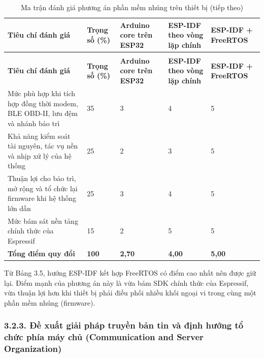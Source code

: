 \documentclass[a4paper]{extarticle}
\newcommand{\thesissettableid}[2]{%
  \renewcommand{\thetable}{#1}%
  \renewcommand{\theHtable}{#2}%
}
\begin{document}
{\thesissettableid{3.5}{condensed-r2-bang-3-5-ma-tran-danh-gia-phuong-an-phan-mem-nhung-tren-thiet-bi}
\def\LTcaptype{table}
\begin{longtable}{|L{(\linewidth - 8\tabcolsep) * }|L{(\linewidth - 8\tabcolsep) * }|L{(\linewidth - 8\tabcolsep) * }|L{(\linewidth - 8\tabcolsep) * }|L{(\linewidth - 8\tabcolsep) * }|}
\caption{Ma trận đánh giá phương án phần mềm nhúng trên thiết bị}\label{tab:condensed-r2-bang-3-5-ma-tran-danh-gia-phuong-an-phan-mem-nhung-tren-thiet-bi}\\
\hline
\textbf{Tiêu chí đánh giá} & \textbf{Trọng số (\%)} & \textbf{Arduino core trên ESP32} & \textbf{ESP-IDF theo vòng lặp chính} & \textbf{ESP-IDF + FreeRTOS} \\
\hline
\endfirsthead
\caption[]{Ma trận đánh giá phương án phần mềm nhúng trên thiết bị (tiếp theo)}\\
\hline
\textbf{Tiêu chí đánh giá} & \textbf{Trọng số (\%)} & \textbf{Arduino core trên ESP32} & \textbf{ESP-IDF theo vòng lặp chính} & \textbf{ESP-IDF + FreeRTOS} \\
\hline
\endhead
\endfoot
\endlastfoot
Mức phù hợp khi tích hợp đồng thời modem, BLE OBD-II, lưu đệm và nhánh bảo trì & 35 & 3 & 4 & 5 \\\hline
Khả năng kiểm soát tài nguyên, tác vụ nền và nhịp xử lý của hệ thống & 25 & 2 & 3 & 5 \\\hline
Thuận lợi cho bảo trì, mở rộng và tổ chức lại firmware khi hệ thống lớn dần & 25 & 3 & 4 & 5 \\\hline
Mức bám sát nền tảng chính thức của Espressif & 15 & 2 & 5 & 5 \\\hline
\textbf{Tổng điểm quy đổi} & \textbf{100} & \textbf{2,70} & \textbf{4,00} & \textbf{5,00} \\\hline
\end{longtable}
}
Từ Bảng 3.5, hướng ESP-IDF kết hợp FreeRTOS có điểm cao nhất nên được giữ lại. Điểm mạnh của phương án này là vừa bám SDK chính thức của Espressif, vừa thuận lợi hơn khi thiết bị phải điều phối nhiều khối ngoại vi trong cùng một phần mềm nhúng (firmware).

\subsubsection{3.2.3. Đề xuất giải pháp truyền bản tin và định hướng tổ chức phía máy chủ (Communication and Server Organization)}\label{ux111ux1ec1-xuux1ea5t-giux1ea3i-phuxe1p-truyux1ec1n-bux1ea3n-tin-vuxe0-ux111ux1ecbnh-hux1b0ux1edbng-tux1ed5-chux1ee9c-phuxeda-muxe1y-chux1ee7-communication-and-server-organization}
\end{document}
